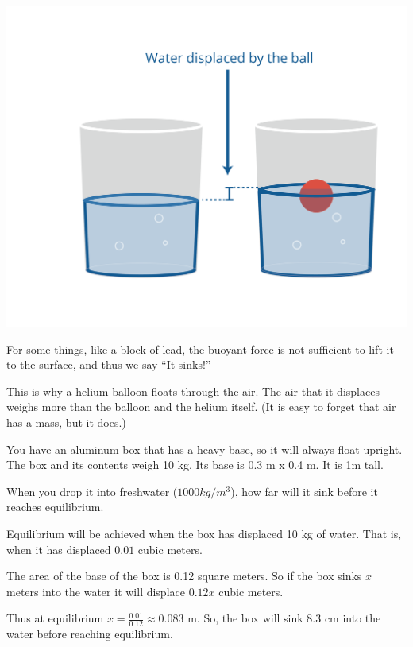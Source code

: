 \includegraphics[width=1\textwidth]{waterDisplacement.png}

For some things, like a block of lead, the buoyant force is not
 sufficient to lift it to the surface, and thus we say ``It sinks!''

This is why a helium balloon floats through the air. The air
that it displaces weighs more than the balloon and the helium itself. (It is easy to forget that air has a mass, but it does.)

\begin{Exercise}[title={Buoyancy}, label=buoyancy]
  You have an aluminum box that has a heavy base, so it will always
  float upright. The box and its contents weigh 10 kg. Its base is 0.3 m x 0.4 m. It is 1m tall.

  When you drop it into freshwater ($1000 kg/m^3$), how far will it sink
  before it reaches equilibrium.
  
\end{Exercise}
\begin{Answer}[ref=buoyancy]
  Equilibrium will be achieved when the box has displaced 10 kg of water. That is, when it has displaced $0.01$ cubic meters.

  The area of the base of the box is 0.12 square meters.  So if the
  box sinks $x$ meters into the water it will displace $0.12 x$ cubic
  meters.

  Thus at equilibrium $x = \frac{0.01}{0.12} \approx 0.083$ m.  So,
  the box will sink 8.3 cm into the water before reaching equilibrium.
\end{Answer}

